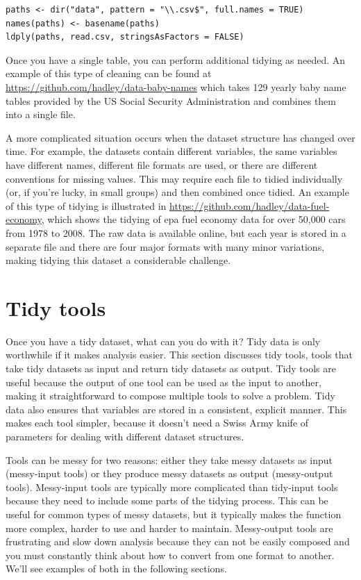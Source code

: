 \documentclass[article]{jss}
\begin{document}
\begin{Verbatim}
paths <- dir("data", pattern = "\\.csv$", full.names = TRUE)
names(paths) <- basename(paths)
ldply(paths, read.csv, stringsAsFactors = FALSE)
\end{Verbatim}

Once you have a single table, you can perform additional tidying as needed. An example of this type of cleaning can be found at \url{https://github.com/hadley/data-baby-names} which takes 129 yearly baby name tables provided by the US Social Security Administration and combines them into a single file.

A more complicated situation occurs when the dataset structure has changed over time. For example, the datasets contain different variables, the same variables have different names, different file formats are used, or there are different conventions for missing values. This may require each file to tidied individually (or, if you're lucky, in small groups) and then combined once tidied. An example of this type of tidying is illustrated in \url{https://github.com/hadley/data-fuel-economy}, which shows the tidying of {\sc epa} fuel economy data for over 50,000 cars from 1978 to 2008. The raw data is available online, but each year is stored in a separate file and there are four major formats with many minor variations, making tidying this dataset a considerable challenge.

\section{Tidy tools}
\label{sec:tidy-tools}

Once you have a tidy dataset, what can you do with it? Tidy data is only worthwhile if it makes analysis easier. This section discusses tidy tools, tools that take tidy datasets as input and return tidy datasets as output. Tidy tools are useful because the output of one tool can be used as the input to another, making it straightforward to compose multiple tools to solve a problem. Tidy data also ensures that variables are stored in a consistent, explicit manner. This makes each tool simpler, because it doesn't need a Swiss Army knife of parameters for dealing with different dataset structures.

Tools can be messy for two reasons: either they take messy datasets as input (messy-input tools) or they produce messy datasets as output (messy-output tools). Messy-input tools are typically more complicated than tidy-input tools because they need to include some parts of the tidying process. This can be useful for common types of messy datasets, but it typically makes the function more complex, harder to use and harder to maintain. Messy-output tools are frustrating and slow down analysis because they can not be easily composed and you must constantly think about how to convert from one format to another. We'll see examples of both in the following sections.
\end{document}

